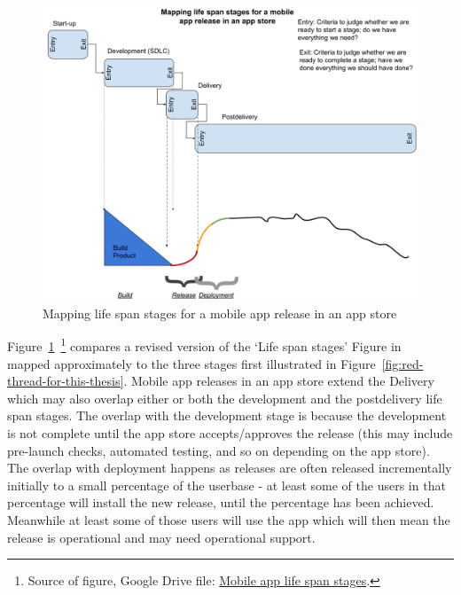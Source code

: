 \begin{figure}
    \centering
    \includegraphics[width=16cm]{images/my/Mobile-app-life-span-stages.png}
    \caption{Mapping life span stages for a mobile app release in an app store}
    \label{fig:mobile-app-life-span-stages}
\end{figure}

Figure~\ref{fig:mobile-app-life-span-stages}~\footnote{Source of figure, Google Drive file: \href{https://docs.google.com/document/d/1d4B5l1tlpclHdKwY8W00qchiCV2YK5JjJP8TbkRHcjQ/edit}{Mobile app life span stages}.} compares a revised version of the `Life span stages' Figure in~\citep[p.155]{evans2004_achieving_software_quality_through_teamwork} mapped approximately to the three stages first illustrated in Figure~\ref{fig:red-thread-for-this-thesis}. Mobile app releases in an app store extend the Delivery which may also overlap either or both the development and the postdelivery life span stages. The overlap with the development stage is because the development is not complete until the app store accepts/approves the release (this may include pre-launch checks, automated testing, and so on depending on the app store). The overlap with deployment happens as releases are often released incrementally initially to a small percentage of the userbase - at least some of the users in that percentage will install the new release, until the percentage has been achieved. Meanwhile at least some of those users will use the app which will then mean the release is operational and may need operational support.



